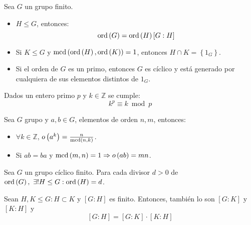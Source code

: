     \begin{coro}
        Sea $G$ un grupo finito.
        \begin{itemize}
        \item $H \le G$, entonces:
        \[
        \operatorname{ord} \left( G \right) = \operatorname{ord}\left( H \right)\left[ G : H \right]
        \]
        \item Si $K \le G$ y $\operatorname{mcd}\left( \operatorname{ord}\left( H \right), \operatorname{ord}\left( K \right) \right) = 1$, entonces $H \cap K = \left\{ 1_G \right\}$.

        \item Si el orden de $G$ es un primo, entonces $G$ es cíclico y está generado por cualquiera de sus elementos distintos de $1_G$.
        \end{itemize}
        \end{coro}

        \begin{coro}
        Dados un entero primo $p$ y $k \in \mathbb{Z}$ se cumple:
        \[
        k^p \equiv k \bmod p
        \]
    \end{coro}

    \begin{lema}
        Sea $G$ grupo y $a, b \in G$, elementos de orden $n, m$, entonces:
        \begin{itemize}
            \item $\forall k \in \mathbb{Z}$, $o\left( a^k \right) = \frac{n}{\operatorname{mcd}\left( n,k \right)}$.
            \item Si $ab = ba$ y $\operatorname{mcd}\left( m, n \right) = 1 \Rightarrow o\left( a b \right) = mn$.
        \end{itemize}
    \end{lema}

    \begin{prop}
        Sea $G$ un grupo cíclico finito. Para cada divisor $d > 0$ de $\operatorname{ord}\left( G \right),\ \exists! H \le G : \operatorname{ord}\left( H \right) = d$.
    \end{prop}

    \begin{prop}
        Sean $H, K \le G: H \subset K$ y $\left[ G : H \right]$ es finito. Entonces, también lo son $\left[ G: K \right]$ y $\left[ K : H \right]$ y 
        \[
            \left[ G : H \right] = \left[ G : K \right] \cdot \left[ K : H \right]
        \]
    \end{prop}
